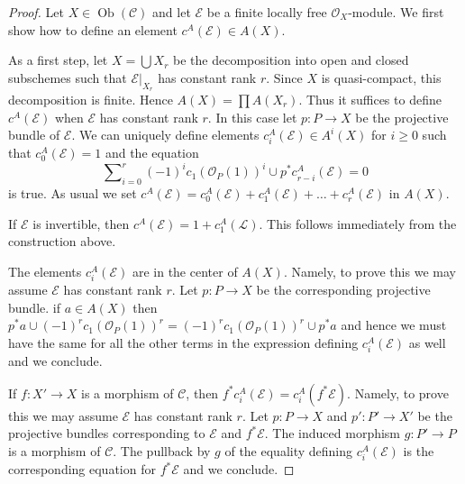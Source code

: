 \documentclass[10pt,a4paper]{amsart}
\theoremstyle{plain}
\theoremstyle{definition}
\theoremstyle{remark}
\numberwithin{equation}{subsection}
\def\Ob{\mathop{\mathrm{Ob}}\nolimits}
\begin{document}
\begin{proof}
Let $X \in \Ob(\mathcal{C})$ and let $\mathcal{E}$ be a finite
locally free $\mathcal{O}_X$-module. We first show how to define
an element $c^A(\mathcal{E}) \in A(X)$.

\medskip\noindent
As a first step, let $X = \bigcup X_r$ be the decomposition into
open and closed subschemes such that $\mathcal{E}|_{X_r}$ has
constant rank $r$. Since $X$ is quasi-compact, this decomposition
is finite. Hence $A(X) = \prod A(X_r)$. Thus it suffices to define
$c^A(\mathcal{E})$ when $\mathcal{E}$ has constant rank $r$. In this
case let $p : P \to X$ be the projective bundle of $\mathcal{E}$.
We can uniquely define elements $c_i^A(\mathcal{E}) \in A^i(X)$
for $i \geq 0$ such that $c_0^A(\mathcal{E}) = 1$ and the equation
\begin{equation}
\label{equation-chern-classes}
\sum\nolimits_{i = 0}^r
(-1)^i c_1(\mathcal{O}_P(1))^i \cup p^*c^A_{r - i}(\mathcal{E})
= 0
\end{equation}
is true. As usual we set
$c^A(\mathcal{E}) = c_0^A(\mathcal{E}) + c_1^A(\mathcal{E}) + \ldots
+ c_r^A(\mathcal{E})$ in $A(X)$.

\medskip\noindent
If $\mathcal{E}$ is invertible, then
$c^A(\mathcal{E}) = 1 + c_1^A(\mathcal{L})$.
This follows immediately from the construction above.

\medskip\noindent
The elements $c_i^A(\mathcal{E})$ are in the center of $A(X)$.
Namely, to prove this we may assume $\mathcal{E}$ has constant rank $r$.
Let $p : P \to X$ be the corresponding projective bundle.
if $a \in A(X)$ then $p^*a \cup (-1)^r c_1(\mathcal{O}_P(1))^r =
(-1)^r c_1(\mathcal{O}_P(1))^r \cup p^*a$ and hence we must have the same
for all the other terms in the expression defining $c_i^A(\mathcal{E})$
as well and we conclude.

\medskip\noindent
If $f : X' \to X$ is a morphism of $\mathcal{C}$, then
$f^*c_i^A(\mathcal{E}) = c_i^A(f^*\mathcal{E})$.
Namely, to prove this we may assume $\mathcal{E}$ has constant rank $r$.
Let $p : P \to X$ and $p' : P' \to X'$ be the projective
bundles corresponding to $\mathcal{E}$ and $f^*\mathcal{E}$.
The induced morphism $g : P' \to P$ is a morphism of $\mathcal{C}$.
The pullback by $g$ of the equality defining $c_i^A(\mathcal{E})$
is the corresponding equation for $f^*\mathcal{E}$ and we conclude.


\end{proof}
\end{document}
